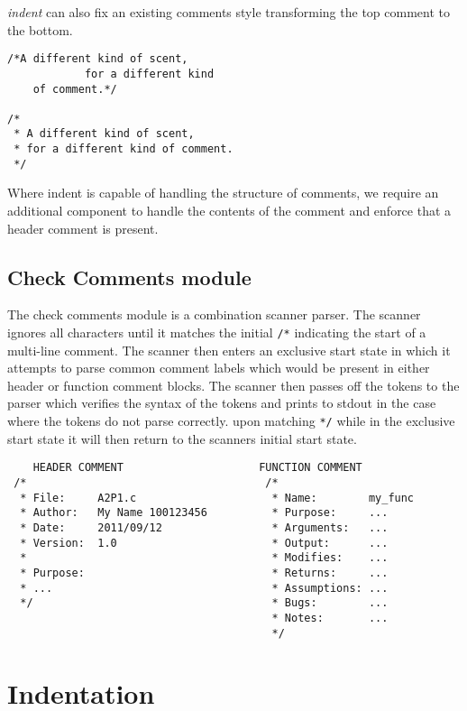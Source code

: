 \noindent \emph{indent} can also fix an existing comments style transforming 
the top comment to the bottom. 
\begin{verbatim}
/*A different kind of scent,
            for a different kind
    of comment.*/
 
/*
 * A different kind of scent,
 * for a different kind of comment.
 */
\end{verbatim}
 
Where indent is capable of handling the structure of comments, we require an 
additional component to handle the contents of the comment and enforce that a 
header comment is present.
\newpage
\subsection{Check Comments module}

The check comments module is a combination scanner parser.
The scanner ignores all characters until it matches the initial \texttt{/*}
indicating the start of a multi-line comment. The scanner then enters an 
exclusive start state in which it attempts to parse common comment labels which
would be present in either header or function comment blocks. The scanner then
passes off the tokens to the parser which verifies the syntax of the tokens and
prints to stdout in the case where the tokens do not parse correctly. upon 
matching \texttt{*/} while in the exclusive start state it will then return to
the scanners initial start state.

\scriptsize{\begin{verbatim}
    HEADER COMMENT                     FUNCTION COMMENT
 /*                                     /*
  * File:     A2P1.c                     * Name:        my_func
  * Author:   My Name 100123456          * Purpose:     ...
  * Date:     2011/09/12                 * Arguments:   ...
  * Version:  1.0                        * Output:      ...
  *                                      * Modifies:    ...
  * Purpose:                             * Returns:     ...
  * ...                                  * Assumptions: ...
  */                                     * Bugs:        ...
                                         * Notes:       ...
                                         */
\end{verbatim}}

\section{Indentation}


